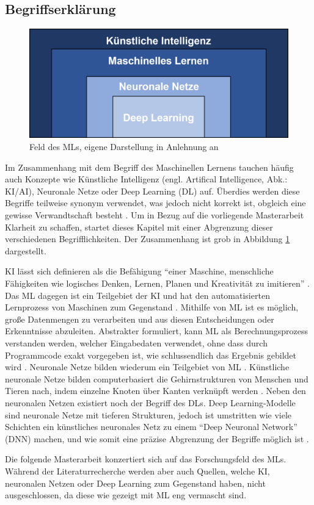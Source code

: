 \subsection{Begriffserklärung}
\label{subsec_MLBegriff}
\begin{figure}
    \centering
    \includegraphics[scale=0.52]{pic/MA-Bilder/KI-ML-DL.PNG}
    \caption{Feld des MLs, eigene Darstellung in Anlehnung an \cite{shinde}}
    \label{Fig:KI-ML-DL}
\end{figure}
Im Zusammenhang mit dem Begriff des \glqq Maschinellen Lernens\grqq{} tauchen häufig auch Konzepte wie \glqq Künstliche Intelligenz\grqq{} (engl. Artifical Intelligence, Abk.: KI/AI), \glqq Neuronale Netze\grqq{} oder \glqq Deep Learning\grqq{} (DL) auf. Überdies werden diese Begriffe teilweise synonym verwendet, was jedoch nicht korrekt ist, obgleich eine gewisse Verwandtschaft besteht \cite{Kerner2020, shinde}. Um in Bezug auf die vorliegende Masterarbeit Klarheit zu schaffen, startet dieses Kapitel mit einer Abgrenzung dieser verschiedenen Begrifflichkeiten. Der Zusammenhang ist grob in Abbildung \ref{Fig:KI-ML-DL} dargestellt.

KI lässt sich definieren als die Befähigung \enquote{einer Maschine, menschliche Fähigkeiten wie logisches Denken, Lernen, Planen und Kreativität zu imitieren} \cite{euki}. Das ML dagegen ist ein Teilgebiet der KI und hat den automatisierten Lernprozess von Maschinen zum Gegenstand \cite{Kerner2020}.  Mithilfe von ML ist es möglich, große Datenmengen zu verarbeiten und aus diesen Entscheidungen oder Erkenntnisse abzuleiten. Abstrakter formuliert, kann ML als Berechnungsprozess verstanden werden, welcher Eingabedaten verwendet, ohne dass durch Programmcode exakt vorgegeben ist, wie schlussendlich das Ergebnis gebildet wird \cite{ElNaqa.2015b}. Neuronale Netze bilden wiederum ein Teilgebiet von ML \cite{Kerner2020}. Künstliche neuronale Netze bilden computerbasiert die Gehirnstrukturen von Menschen und Tieren nach, indem einzelne Knoten über Kanten verknüpft werden \cite{rojas2001kunstliche}. Neben den neuronalen Netzen existiert noch der Begriff des DLs. Deep Learning-Modelle sind neuronale Netze mit tieferen Strukturen, jedoch ist umstritten wie viele Schichten ein künstliches neuronales Netz zu einem \enquote{Deep Neuronal Network} (DNN) machen, und wie somit eine präzise Abgrenzung der Begriffe möglich ist \cite{Kerner2020}.

Die folgende Masterarbeit konzertiert sich auf das Forschungsfeld des MLs. Während der Literaturrecherche werden aber auch Quellen, welche KI, neuronalen Netzen oder Deep Learning zum Gegenstand haben, nicht ausgeschlossen, da diese wie gezeigt mit ML eng vermascht sind.